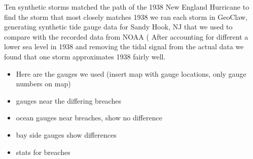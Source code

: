 Ten synthetic storms matched the path of the 1938 New England Hurricane to find the storm that most closely matches 1938 we ran each storm in GeoClaw, generating synthetic tide gauge data for Sandy Hook, NJ that we used to compare with the recorded data from NOAA (%
After accounting for different a lower sea level in 1938 and removing the tidal signal from the actual data we found that one storm approximates 1938 fairly well.
\begin{itemize}
    \item Here are the gauges we used (insert map with gauge locations, only gauge numbers on map)
    \item gauges near the differing breaches
    \item ocean gauges near breaches, show no difference
    \item bay side gauges show differences
    \item stats for breaches
    
\end{itemize}




